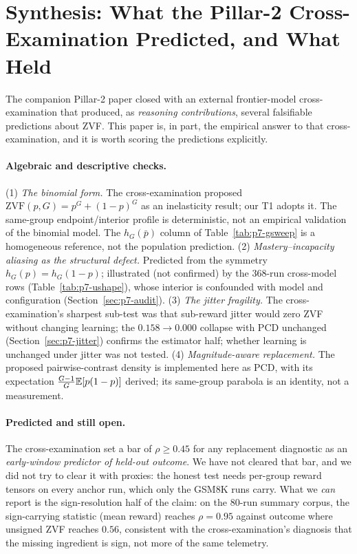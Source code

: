 \section{Synthesis: What the Pillar-2 Cross-Examination Predicted, and What
Held}
\label{sec:p7-synthesis}
The companion Pillar-2 paper closed with an external frontier-model
cross-examination that produced, as \emph{reasoning contributions},
several falsifiable predictions about ZVF. This paper is, in part, the
empirical answer to that cross-examination, and it is worth scoring the
predictions explicitly.

\paragraph{Algebraic and descriptive checks.} (1) \emph{The binomial form.} The
cross-examination proposed $\mathrm{ZVF}(p, G) = p^G + (1-p)^G$ as an
inelasticity result; our T1 adopts it. The same-group endpoint/interior
profile is deterministic, not an empirical validation of the binomial model.
The $h_G(\bar p)$ column of Table~\ref{tab:p7-gsweep} is a homogeneous
reference, not the population prediction. (2) \emph{Mastery--incapacity
aliasing as the structural defect.} Predicted from the symmetry
$h_G(p) = h_G(1-p)$; illustrated (not confirmed) by the 368-run cross-model
rows (Table~\ref{tab:p7-ushape}), whose interior is confounded with model and
configuration (Section~\ref{sec:p7-audit}).
(3) \emph{The jitter fragility.} The cross-examination's sharpest sub-test
was that sub-reward jitter would zero ZVF without changing learning; the
$0.158 \to 0.000$ collapse with PCD unchanged
(Section~\ref{sec:p7-jitter}) confirms the estimator half; whether learning
is unchanged under jitter was not tested. (4) \emph{Magnitude-aware
replacement.} The proposed pairwise-contrast density is implemented here as
PCD, with its expectation $\frac{G-1}{G}\mathbb{E}[p(1-p)]$ derived; its same-group
parabola is an identity, not a measurement.

\paragraph{Predicted and still open.} The cross-examination set a bar of
$\rho \geq 0.45$ for any replacement diagnostic as an \emph{early-window
predictor of held-out outcome}. We have not cleared that bar, and we did
not try to clear it with proxies: the honest test needs per-group reward
tensors on every anchor run, which only the GSM8K runs carry. What we
\emph{can} report is the sign-resolution half of the claim: on the 80-run
summary corpus, the sign-carrying statistic (mean reward) reaches
$\rho = 0.95$ against outcome where unsigned ZVF reaches $0.56$, consistent
with the cross-examination's diagnosis that the missing ingredient is sign,
not more of the same telemetry.

